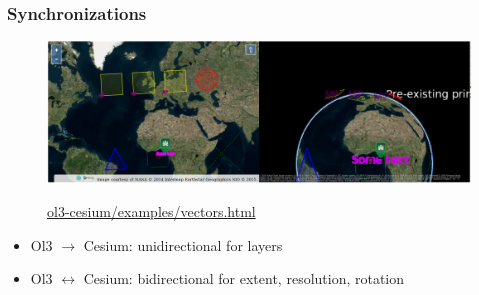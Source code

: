 \documentclass{beamer}
\begin{document}
  \begin{frame}
    \frametitle{Synchronizations}
    \begin{figure}
    \begin{center}
      \href{http://openlayers.org/ol3-cesium/examples/vectors.html}{
      \includegraphics[width=\linewidth]{./capture_vectors_example.png}}
    \end{center}
    \href{http://openlayers.org/ol3-cesium/examples/vectors.html}{ol3-cesium/examples/vectors.html}
    \end{figure}

    \begin{itemize}
     \item Ol3 $\rightarrow$ Cesium: unidirectional for layers
     \pause
     \item Ol3 $\leftrightarrow$ Cesium: bidirectional for extent, resolution, rotation
    \end{itemize}
  \end{frame}
\end{document}
